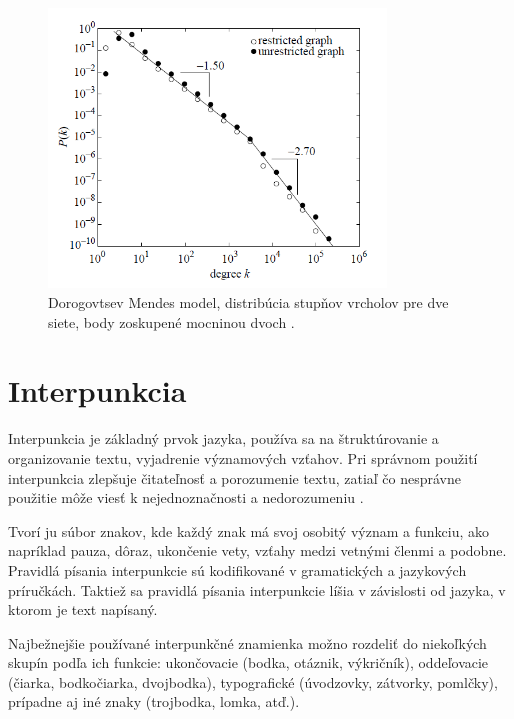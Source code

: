 \begin{figure}
    \centerline{\includegraphics[width=0.8\textwidth]{images/degdist.png}}
    \caption[Distribúcia stupňov vrcholov, Dorogovtsev Mendes model]{Dorogovtsev Mendes model, distribúcia stupňov vrcholov pre dve siete,
    body zoskupené mocninou dvoch \cite{cancho2001small} .}
    \label{obr:degdist}
\end{figure}

\clearpage

\section{Interpunkcia}\label{sec:punctuation}

Interpunkcia je základný prvok jazyka, používa sa na štruktúrovanie a organizovanie textu, vyjadrenie významových vzťahov.
Pri správnom použití interpunkcia zlepšuje čitateľnosť a porozumenie textu, zatiaľ čo nesprávne použitie môže viesť k
nejednoznačnosti a nedorozumeniu \cite{lubis2025mastering}.

Tvorí ju súbor znakov, kde každý znak má svoj osobitý význam a funkciu, ako napríklad pauza, dôraz, ukončenie vety, vzťahy medzi vetnými členmi
a podobne. Pravidlá písania interpunkcie sú kodifikované v gramatických a jazykových príručkách. Taktiež sa pravidlá písania interpunkcie líšia
v závislosti od jazyka, v ktorom je text napísaný.

Najbežnejšie používané interpunkčné znamienka možno rozdeliť do niekoľkých skupín podľa ich funkcie:
ukončovacie (bodka, otáznik, výkričník), oddeľovacie (čiarka, bodkočiarka, dvojbodka), typografické (úvodzovky, zátvorky, pomlčky),
prípadne aj iné znaky (trojbodka, lomka, atď.).

